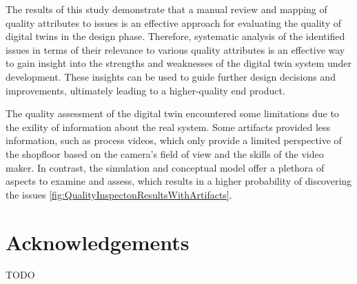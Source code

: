 \documentclass{llncs}
\begin{document}
    The results of this study demonstrate that a manual review and mapping of quality attributes to issues is an effective approach for evaluating the quality of digital twins in the design phase.  
    Therefore, systematic analysis of the identified issues in terms of their relevance to various quality attributes is an effective way to gain insight into the strengths and weaknesses of the digital twin system under development. 
    These insights can be used to guide further design decisions and improvements, ultimately leading to a higher-quality end product.

    The quality assessment of the digital twin encountered some limitations due to the exility of information about the real system. Some artifacts provided less information, such as process videos, which only provide a limited perspective of the shopfloor based on the camera's field of view and the skills of the video maker. 
    In contrast, the simulation and conceptual model offer a plethora of aspects to examine and assess, which results in a higher probability of discovering the issues \ref{fig:QualityInspectonResultsWithArtifacts}.



    
    \section*{Acknowledgements}
    TODO

    
    
\end{document}
